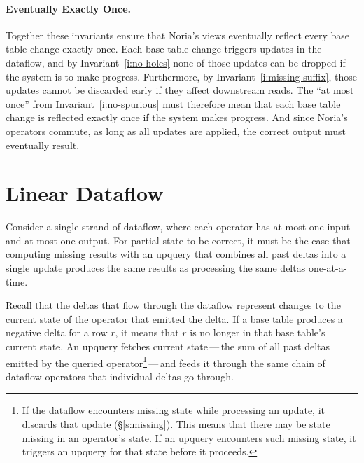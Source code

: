\paragraph{Eventually Exactly Once.}
Together these invariants ensure that Noria's views eventually reflect every
base table change exactly once. Each base table change triggers updates in the
dataflow, and by Invariant~\ref{i:no-holes} none of those updates can be dropped
if the system is to make progress. Furthermore, by
Invariant~\ref{i:missing-suffix}, those updates cannot be discarded early if
they affect downstream reads. The ``at most once'' from
Invariant~\ref{i:no-spurious} must therefore mean that each base table change is
reflected exactly once if the system makes progress. And since Noria's operators
commute, as long as all updates are applied, the correct output must eventually
result.


\section{Linear Dataflow}
\label{s:partial:linear}

Consider a single strand of dataflow, where each operator has at most one input
and at most one output. For partial state to be correct, it must be the case
that computing missing results with an upquery that combines all past deltas
into a single update produces the same results as processing the same deltas
one-at-a-time.

Recall that the deltas that flow through the dataflow represent changes to the
current state of the operator that emitted the delta. If a base table produces
a negative delta for a row $r$, it means that $r$ is no longer in that base
table's current state. An upquery fetches current state\,---\,the sum of all
past deltas emitted by the queried operator\footnote{If the dataflow encounters
missing state while processing an update, it discards that update
(\S\ref{s:missing}). This means that there may be state missing in an operator's
state. If an upquery encounters such missing state, it triggers an upquery for
that state before it proceeds.}\,---\,and feeds it through the same chain of
dataflow operators that individual deltas go through.

